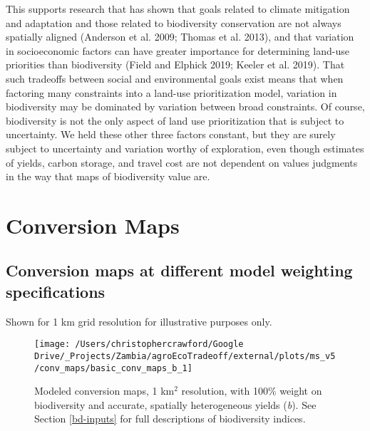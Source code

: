 \documentclass[
]{article}
\begin{document}
This supports research that has shown that goals related to climate mitigation and adaptation and those related to biodiversity conservation are not always spatially aligned (Anderson et al. 2009; Thomas et al. 2013), and that variation in socioeconomic factors can have greater importance for determining land-use priorities than biodiversity (Field and Elphick 2019; Keeler et al. 2019). That such tradeoffs between social and environmental goals exist means that when factoring many constraints into a land-use prioritization model, variation in biodiversity may be dominated by variation between broad constraints. Of course, biodiversity is not the only aspect of land use prioritization that is subject to uncertainty. We held these other three factors constant, but they are surely subject to uncertainty and variation worthy of exploration, even though estimates of yields, carbon storage, and travel cost are not dependent on values judgments in the way that maps of biodiversity value are.

\newpage

\hypertarget{conv-maps}{%
\section{Conversion Maps}\label{conv-maps}}

\hypertarget{conversion-maps-at-different-model-weighting-specifications}{%
\subsection{Conversion maps at different model weighting specifications}\label{conversion-maps-at-different-model-weighting-specifications}}

Shown for 1 km grid resolution for illustrative purposes only.













\begin{figure}
\texttt{[image: /Users/christophercrawford/Google Drive/\_Projects/Zambia/agroEcoTradeoff/external/plots/ms\_v5/conv\_maps/basic\_conv\_maps\_b\_1]} \caption{Modeled conversion maps, 1 km\(^2\) resolution, with 100\% weight on biodiversity and accurate, spatially heterogeneous yields (\emph{b}). See Section \ref{bd-inputs} for full descriptions of biodiversity indices.}\label{fig:conv-maps-1-b}
\end{figure}
\end{document}
